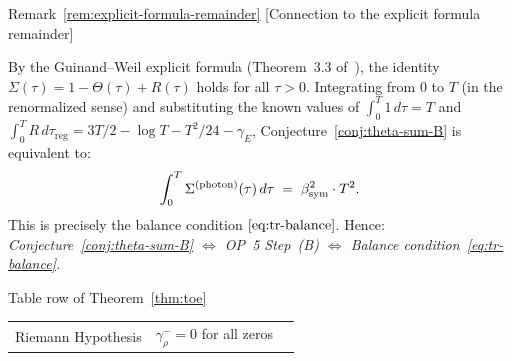 \begin{qsarchived}{Remark~\ref{rem:explicit-formula-remainder} [Connection to the explicit formula remainder]}
\begin{remark}

By the Guinand--Weil explicit formula
(Theorem~3.3 of~\cite{brendecke2026rh}), the identity
$\Sigma(\tau) = 1 - \Theta(\tau) + R(\tau)$ holds for all $\tau > 0$.
Integrating from $0$ to $T$ (in the renormalized sense) and
substituting the known values of $\int_0^T 1\,d\tau = T$ and
$\int_0^T R\,d\tau_{\mathrm{reg}} = 3T/2 - \log T - T^2/24 - \gamma_E$,
Conjecture~\ref{conj:theta-sum-B} is equivalent to:
\[
 \int_0^T \Sigma^{(\mathrm{photon})}(\tau)\,d\tau
 \;=\; \beta_{\mathrm{sym}}^2 \cdot T^2.
\]
This is precisely the balance condition $\eqref{eq:tr-balance}$.
Hence: \emph{Conjecture~\ref{conj:theta-sum-B} $\Leftrightarrow$
OP~5 Step~(B) $\Leftrightarrow$ Balance condition~\eqref{eq:tr-balance}.}
\end{remark}
\end{qsarchived}

\begin{qsarchived}{Table row of Theorem~\ref{thm:toe}}
\begin{tabular}{lll}
Riemann Hypothesis & $\gamma^-_\rho=0$ for all zeros & \cite{brendecke2026rh}\\
\end{tabular}
\end{qsarchived}

